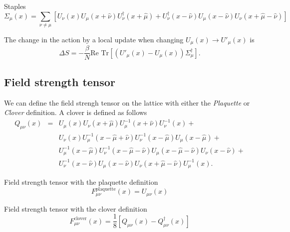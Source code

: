 \documentclass[12pt,a4paper]{article}
\begin{document}
Staples
\begin{equation}
	\label{eq:staples}
	\Sigma_{\mu}(x) = \sum_{\nu \neq \mu} \left[ U_{\nu}(x)U_{\mu}(x+\hat{\nu})U_{\nu}^{\dagger}(x+\hat{\mu}) + U_{\nu}^{\dagger}(x-\hat{\nu})U_{\mu}(x-\hat{\nu})U_{\nu}(x+\hat{\mu}-\hat{\nu})\right]
\end{equation}


The change in the action  by a local update when changing $U_{\mu}(x) \to U'_{\mu}(x)$ is
\begin{equation}
	\label{eq:DS}
	\Delta S = -\frac{\beta}{N} \text{Re } \text{Tr} \left[ \left( U'_{\mu}(x) - U_{\mu}(x) \right)\Sigma_{\mu}^{\dagger}\right].
\end{equation}

\subsection{Field strength tensor}

We can define the field strengh tensor on the lattice with either the \emph{Plaquette} or \emph{Clover} definition. A clover is defined as follows
\begin{eqnarray}
    Q_{\mu\nu}(x) & = & U_{\mu}(x)U_{\nu}(x+\hat{\mu})U_{\mu}^{-1}(x+\hat{\nu})U_{\nu}^{-1}(x)  +  \nonumber\\
    & & U_{\nu}(x)U_{\mu}^{-1}(x-\hat{\mu}+\hat{\nu})U_{\nu}^{-1}(x-\hat{\mu})U_{\mu}(x-\hat{\mu})  + \nonumber\\ 
    & & U_{\mu}^{-1}(x-\hat{\mu})U_{\nu}^{-1}(x-\hat{\mu}-\hat{\nu})U_{\mu}(x-\hat{\mu}-\hat{\nu})U_{\nu}(x-\hat{\nu})+\nonumber\\
    &  & U_{\nu}^{-1}(x-\hat{\nu}) U_{\mu}(x-\hat{\nu})U_{\nu}(x+\hat{\mu}-\hat{\nu})U_{\mu}^{-1}(x).
\end{eqnarray}

Field strength tensor with the plaquette definition
\begin{equation}
    F^{\text{plaquette}}_{\mu\nu}(x) = U_{\mu\nu}(x)
\end{equation}

Field strength tensor with the clover definition
\begin{equation}
    F^{\text{clover}}_{\mu\nu}(x) = \frac{1}{8}\left[ Q_{\mu\nu}(x) -  Q_{\mu\nu}^{\dagger}(x)\right]
\end{equation}
\end{document}
